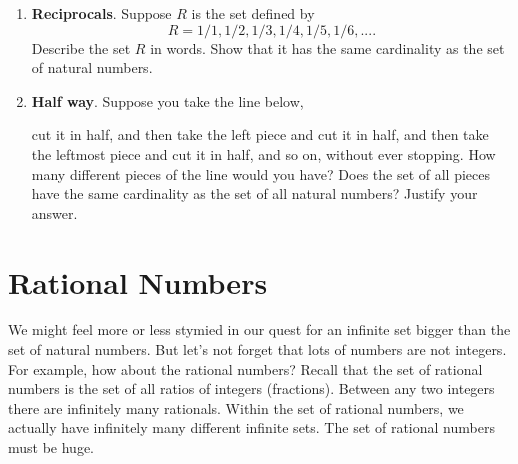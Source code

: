 \begin{enumerate}
\item \textbf{Reciprocals}. Suppose $R$ is the set defined by 
\[R = 1/1, 1/2, 1/3, 1/4, 1/5, 1/6, ... .\]
Describe the set $R$ in words. Show that it has the same cardinality as the set of natural numbers.

\vfill 

%

\item \textbf{Half way}. Suppose you take the line below,

\hrulefill

cut it in half, and then take the left piece and cut it in half, and then take the leftmost piece and cut it in half, and so on, without ever stopping. How many different pieces of the line would you have? Does the set of all pieces have the same cardinality as the set of all natural numbers? Justify your answer. \vfill
\end{enumerate}

\clearpage
\section{Rational Numbers} \label{RationalNumbers}

We might feel more or less stymied in our quest for an infinite set bigger than the set of natural numbers. But let's not forget that lots of numbers are not integers. For example, how about the rational numbers? Recall that the set of rational numbers is the set of all ratios of integers (fractions). Between any two integers there are infinitely many rationals. Within the set of rational numbers, we actually have infinitely many different infinite sets. The set of rational numbers must be huge.


